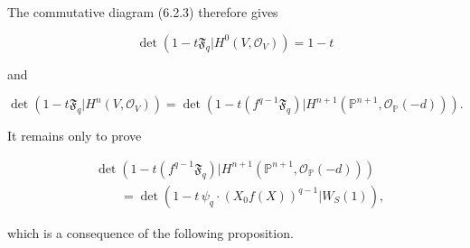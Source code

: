 The commutative diagram (6.2.3) therefore gives

\begin{equation}\tag{6.2.6}
\det\!\left(1-t\mathfrak F_q
\mathrel{\Big|}H^0(V,\mathcal O_V)\right)=1-t
\end{equation}

and

\begin{equation}\tag{6.2.7}
\det\!\left(1-t\mathfrak F_q
\mathrel{\Big|}H^n(V,\mathcal O_V)\right)
=
\det\!\left(
1-t(f^{q-1}\mathfrak F_q)
\mathrel{\Big|}
H^{n+1}(\mathbb P^{n+1},\mathcal O_{\mathbb P}(-d))
\right).
\end{equation}

It remains only to prove

\begin{equation}\tag{6.2.8}
\begin{aligned}
&\det\!\left(
1-t(f^{q-1}\mathfrak F_q)
\mathrel{\Big|}
H^{n+1}(\mathbb P^{n+1},\mathcal O_{\mathbb P}(-d))
\right)\\
&\qquad=
\det\!\left(
1-t\,\psi_q\cdot(X_0f(X))^{q-1}
\mathrel{\Big|}W_S(1)
\right),
\end{aligned}
\end{equation}

which is a consequence of the following proposition.


